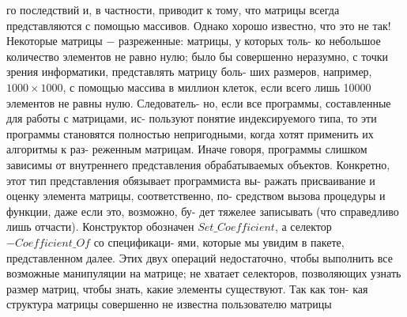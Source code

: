 \documentclass{./git_rep/mai_prac_2017/template/mai_book}
\begin{document}
\noindent
го последствий и, в частности, приводит к тому, что матрицы всегда\linebreak
представляются с помощью массивов. Однако хорошо известно, что это\linebreak
не так! Некоторые матрицы $-$ разреженные: матрицы, у которых толь-\linebreak
ко небольшое количество элементов не равно нулю; было бы совершенно\linebreak
неразумно, с точки зрения информатики, представлять матрицу боль-\linebreak
ших размеров, например, $1000\times 1000$, с помощью массива в миллион\linebreak
клеток, если всего лишь 10000 элементов не равны нулю. Следователь-\linebreak
но,  если  все  программы,  составленные  для  работы  с  матрицами, ис-\linebreak
пользуют понятие индексируемого типа, то эти программы становятся\linebreak
полностью непригодными, когда хотят применить их алгоритмы к раз-\linebreak
реженным матрицам. Иначе говоря, программы слишком зависимы от\linebreak
внутреннего представления обрабатываемых объектов.\newline
\hspace*{15pt}Конкретно, этот тип  представления обязывает программиста вы-\linebreak
ражать присваивание и оценку элемента матрицы, соответственно, по-\linebreak
средством вызова процедуры и функции, даже если это, возможно, бу-\linebreak
дет тяжелее записывать (что справедливо лишь отчасти). Конструктор\linebreak 
обозначен $Set\_Coefficient$, а селектор $- Coefficient\_Of$ со спецификаци-\linebreak
ями, которые мы увидим в пакете, представленном далее.\newline
\hspace*{15pt}Этих двух операций недостаточно, чтобы выполнить все возможные\linebreak
манипуляции на матрице; не хватает селекторов, позволяющих узнать\linebreak
размер матриц, чтобы знать, какие элементы существуют. Так как тон-\linebreak
кая структура матрицы совершенно не известна пользователю матрицы\linebreak
\end{document}

